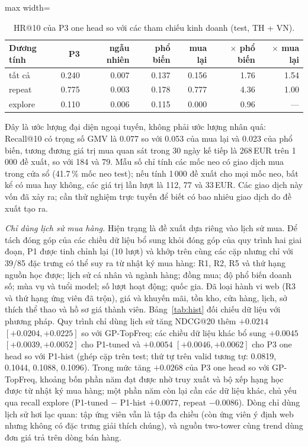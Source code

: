 \documentclass[jtehm]{ieeeaccess}
\begin{document}
\begin{table}[t]
\caption{HR@10 của P3 one head so với các tham chiếu kinh doanh (test, TH + VN).}
\label{tab:t38}
\setlength{\tabcolsep}{3pt}
\centering
\begin{adjustbox}{max width=\columnwidth}
\begin{tabular}{lrrrrrr}
\toprule
Dương tính & P3 & ngẫu nhiên & phổ biến & mua lại & $\times$ phổ biến & $\times$ mua lại \\
\midrule
tất cả  & 0.240 & 0.007 & 0.137 & 0.156 & 1.76 & 1.54 \\
repeat  & 0.775 & 0.003 & 0.178 & 0.777 & 4.36 & 1.00 \\
explore & 0.110 & 0.006 & 0.115 & 0.000 & 0.96 & --- \\
\bottomrule
\end{tabular}
\end{adjustbox}
\end{table}

Đây là ước lượng đại diện ngoại tuyến, không phải ước lượng nhân quả: Recall@10 có trọng số GMV là 0.077 so với 0.053 của mua lại và 0.023 của phổ biến, tương đương giá trị mua quan sát trong 30 ngày kế tiếp là 268\,EUR trên 1\,000 đề xuất, so với 184 và 79. Mẫu số chỉ tính các mốc neo có giao dịch mua trong cửa sổ (41.7\,\% mốc neo test); nếu tính 1\,000 đề xuất cho mọi mốc neo, bất kể có mua hay không, các giá trị lần lượt là 112, 77 và 33\,EUR. Các giao dịch này vốn đã xảy ra; cần thử nghiệm trực tuyến để biết có bao nhiêu giao dịch do đề xuất tạo ra.

\textit{Chỉ dùng lịch sử mua hàng.} Hiện trạng là đề xuất dựa riêng vào lịch sử mua. Để tách đóng góp của các chiều dữ liệu bổ sung khỏi đóng góp của quy trình hai giai đoạn, P1 được tinh chỉnh lại (10 lượt) và khớp trên cùng các cặp nhưng chỉ với 39/85 đặc trưng có thể suy ra từ nhật ký mua hàng: R1, R2, R5 và thứ hạng nguồn học được; lịch sử cá nhân và ngành hàng; đồng mua; độ phổ biến doanh số; mùa vụ và tuổi model; số lượt hoạt động; quốc gia. Đã loại hành vi web (R3 và thứ hạng ứng viên đã trộn), giá và khuyến mãi, tồn kho, cửa hàng, lịch, sở thích thể thao và hồ sơ giá thành viên. Bảng~\ref{tab:hist} đối chiếu dữ liệu với phương pháp. Quy trình chỉ dùng lịch sử tăng NDCG@20 thêm $+0.0214$ $[+0.0204, +0.0225]$ so với GP-TopFreq; các chiều dữ liệu khác bổ sung $+0.0045$ $[+0.0039, +0.0052]$ cho P1-tuned và $+0.0054$ $[+0.0046, +0.0062]$ cho P3 one head so với P1-hist (ghép cặp trên test; thứ tự trên valid tương tự: 0.0819, 0.1044, 0.1088, 0.1096). Trong mức tăng $+0.0268$ của P3 one head so với GP-TopFreq, khoảng bốn phần năm đạt được nhờ truy xuất và bộ xếp hạng học được từ nhật ký mua hàng; một phần năm còn lại cần các dữ liệu khác, chủ yếu qua recall explore (P1-tuned $-$ P1-hist $+0.0077$, repeat $-0.0086$). Dòng chỉ dùng lịch sử hơi lạc quan: tập ứng viên vẫn là tập đa chiều (còn ứng viên ý định web nhưng không có đặc trưng giải thích chúng), và nguồn two-tower cùng trend dùng đơn giá trả trên dòng bán hàng.
\end{document}
